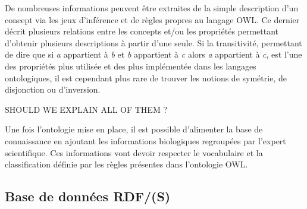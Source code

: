 De nombreuses informations peuvent être extraites de la simple description d'un concept via les jeux d'inférence et de règles propres au langage OWL. Ce dernier décrit plusieurs relations entre les concepts et/ou les propriétés permettant d'obtenir plusieurs descriptions à partir d'une seule. Si la transitivité, permettant de dire que si \textit{a} appartient à \textit{b} et \textit{b} appartient à \textit{c} alors \textit{a} appartient à \textit{c},
est l'une des propriétés plus utilisée et des plus implémentée dans les langages ontologiques, il est cependant plus rare de trouver les notions de symétrie, de disjonction ou d'inversion. 

SHOULD WE EXPLAIN ALL OF THEM ?

Une fois l'ontologie mise en place, il est possible d'alimenter la base de connaissance en ajoutant les informations biologiques regroupées par l'expert scientifique. Ces informations vont devoir respecter le vocabulaire et la classification définie par les règles présentes dans l'ontologie OWL.

\subsection{Base de données RDF/(S)}

